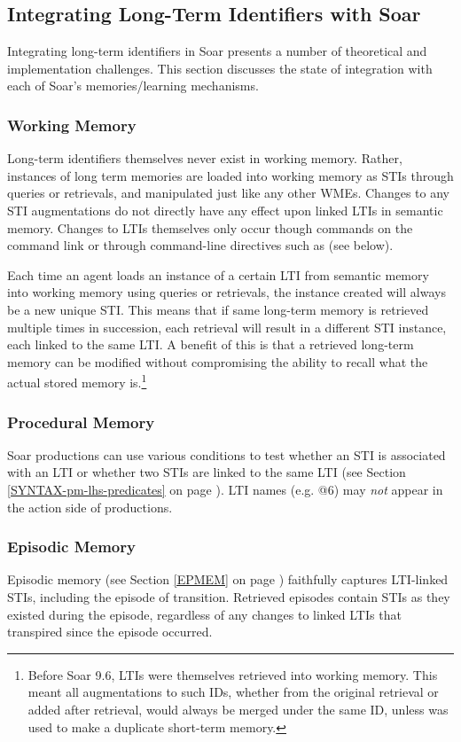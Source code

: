 \subsection{Integrating Long-Term Identifiers with Soar}
Integrating long-term identifiers in Soar presents a number of theoretical and implementation challenges.
This section discusses the state of integration with each of Soar's memories/learning mechanisms.

\subsubsection{Working Memory}
Long-term identifiers themselves never exist in working memory. Rather, instances of long term memories are loaded into working memory as STIs through queries or retrievals, and manipulated just like any other WMEs. Changes to any STI augmentations do not directly have any effect upon linked LTIs in semantic memory. Changes to LTIs themselves only occur though  commands on the command link  or through command-line directives such as  (see below).

Each time an agent loads an instance of a certain LTI from semantic memory into working memory using queries or retrievals, the instance created will always be a new unique STI. This means that if same long-term memory is retrieved multiple times in succession, each retrieval will result in a different STI instance, each linked to the same LTI. A benefit of this is that a retrieved long-term memory can be modified without compromising the ability to recall what the actual stored memory is.\footnote{
	Before Soar 9.6, LTIs were themselves retrieved into working memory. This meant all augmentations to such IDs, whether from the original retrieval or added after retrieval, would always be merged under the same ID, unless  was used to make a duplicate short-term memory.}

\subsubsection{Procedural Memory}
Soar productions can use various conditions to test whether an STI is associated with an LTI or whether two STIs are linked to the same LTI (see Section \ref{SYNTAX-pm-lhs-predicates} on page \pageref{SYNTAX-pm-lhs-predicates}).
LTI names (e.g. {@}6) may \emph{not} appear in the action side of productions.

\subsubsection{Episodic Memory}
Episodic memory (see Section \ref{EPMEM} on page \pageref{EPMEM}) faithfully captures LTI-linked STIs, including the episode of transition.
Retrieved episodes contain STIs as they existed during the episode, regardless of any changes to linked LTIs that transpired since the episode occurred.

